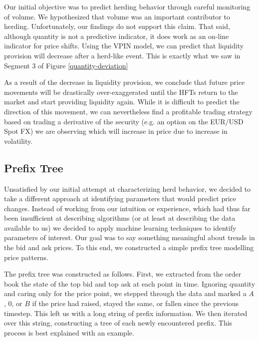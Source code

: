 Our initial objective was to predict herding behavior through careful monitoring of volume. 
We hypothesized that volume was an important contributor to herding.
Unfortunately, our findings do not support this claim.
That said, although quantity is not a predictive indicator, it does work as an on-line indicator for price shifts.
Using the VPIN model, we can predict that liquidity provision will decrease after a herd-like event.
This is exactly what we saw in Segment 3 of Figure \ref{quantity-deviation}

As a result of the decrease in liquidity provision, we conclude that future price movements will be drastically over-exaggerated until the HFTs return to the market and start providing liquidity again.
While it is difficult to predict the direction of this movement, we can nevertheless find a profitable trading strategy based on trading a derivative of the security (e.g. an option on the EUR/USD Spot FX) we are observing which will increase in price due to increase in volatility.

\subsection{Prefix Tree}
Unsatisfied by our initial attempt at characterizing herd behavior, we decided to take a different approach at identifying parameters that would predict price changes.
Instead of working from our intuition or experience, which had thus far been insufficient at describing algorithms (or at least at describing the data available to us) we decided to apply machine learning techniques to identify parameters of interest.
Our goal was to say something meaningful about trends in the bid and ask prices.
To this end, we constructed a simple prefix tree modelling price patterns.

The prefix tree was constructed as follows. 
First, we extracted from the order book the state of the top bid and top ask at each point in time.
Ignoring quantity and caring only for the price point, we stepped through the data and marked a $A$, 0, or $B$ if the price had raised, stayed the same, or fallen since the previous timestep.
This left us with a long string of prefix information.
We then iterated over this string, constructing a tree of each newly encountered prefix. 
This process is best explained with an example. 


